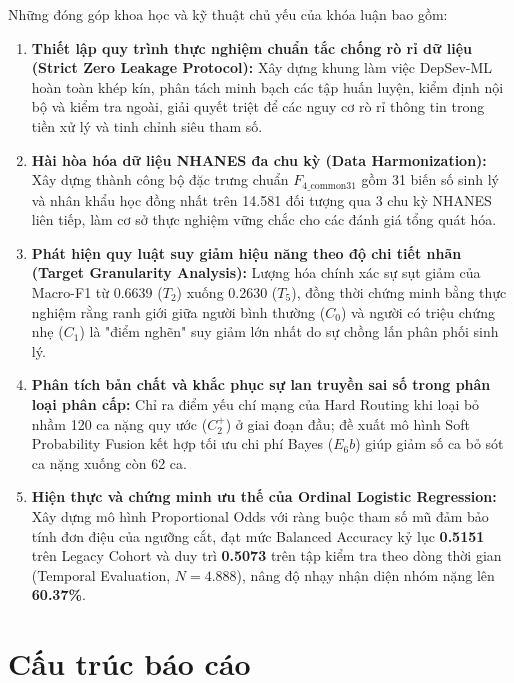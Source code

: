 Những đóng góp khoa học và kỹ thuật chủ yếu của khóa luận bao gồm:
\begin{enumerate}
    \item \textbf{Thiết lập quy trình thực nghiệm chuẩn tắc chống rò rỉ dữ liệu (Strict Zero Leakage Protocol):} Xây dựng khung làm việc DepSev-ML hoàn toàn khép kín, phân tách minh bạch các tập huấn luyện, kiểm định nội bộ và kiểm tra ngoài, giải quyết triệt để các nguy cơ rò rỉ thông tin trong tiền xử lý và tinh chỉnh siêu tham số.
    \item \textbf{Hài hòa hóa dữ liệu NHANES đa chu kỳ (Data Harmonization):} Xây dựng thành công bộ đặc trưng chuẩn $F_{4\_\text{common31}}$ gồm 31 biến số sinh lý và nhân khẩu học đồng nhất trên 14.581 đối tượng qua 3 chu kỳ NHANES liên tiếp, làm cơ sở thực nghiệm vững chắc cho các đánh giá tổng quát hóa.
    \item \textbf{Phát hiện quy luật suy giảm hiệu năng theo độ chi tiết nhãn (Target Granularity Analysis):} Lượng hóa chính xác sự sụt giảm của Macro-F1 từ 0.6639 ($T_2$) xuống 0.2630 ($T_5$), đồng thời chứng minh bằng thực nghiệm rằng ranh giới giữa người bình thường ($C_0$) và người có triệu chứng nhẹ ($C_1$) là "điểm nghẽn" suy giảm lớn nhất do sự chồng lấn phân phối sinh lý.
    \item \textbf{Phân tích bản chất và khắc phục sự lan truyền sai số trong phân loại phân cấp:} Chỉ ra điểm yếu chí mạng của Hard Routing khi loại bỏ nhầm 120 ca nặng quy ước ($C_2^+$) ở giai đoạn đầu; đề xuất mô hình Soft Probability Fusion kết hợp tối ưu chi phí Bayes ($E_6b$) giúp giảm số ca bỏ sót ca nặng xuống còn 62 ca.
    \item \textbf{Hiện thực và chứng minh ưu thế của Ordinal Logistic Regression:} Xây dựng mô hình Proportional Odds với ràng buộc tham số mũ đảm bảo tính đơn điệu của ngưỡng cắt, đạt mức Balanced Accuracy kỷ lục \textbf{0.5151} trên Legacy Cohort và duy trì \textbf{0.5073} trên tập kiểm tra theo dòng thời gian (Temporal Evaluation, $N = 4.888$), nâng độ nhạy nhận diện nhóm nặng lên \textbf{60.37\%}.
\end{enumerate}

\section{Cấu trúc báo cáo}
\label{sec:cau-truc-bao-cao}

